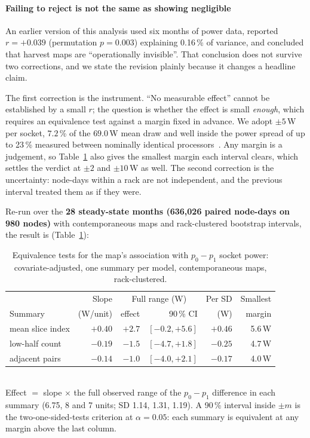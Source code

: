 \documentclass[10pt,conference]{IEEEtran}
\begin{document}
\paragraph*{Failing to reject is not the same as showing negligible} An earlier version of this
analysis used six months of power data, reported $r=+0.039$ (permutation $p=0.003$) explaining
0.16\,\% of variance, and concluded that harvest maps are ``operationally invisible''. That
conclusion does not survive two corrections, and we state the revision plainly because it changes
a headline claim.

The first correction is the instrument. ``No measurable effect'' cannot be established by a small
$r$; the question is whether the effect is small \emph{enough}, which requires an equivalence
test against a margin fixed in advance. We adopt $\pm5$\,W per socket, $7.2$\,\% of the
$69.0$\,W mean draw and well inside the power spread of up to 23\,\% measured between nominally
identical processors~\cite{inadomi2015variation}. Any margin is a judgement, so
Table~\ref{tab:tost} also gives the smallest margin each interval clears, which settles the verdict
at $\pm2$ and $\pm10$\,W as well. The second correction is
the uncertainty: node-days within a rack are not independent, and the previous interval treated
them as if they were.

Re-run over the \textbf{28 steady-state months (636{,}026 paired node-days on 980 nodes)} with
contemporaneous maps and rack-clustered bootstrap intervals, the result is
(Table~\ref{tab:tost}):

\begin{table}[h]\centering\caption{Equivalence tests for the map's association with $p_0-p_1$
socket power: covariate-adjusted, one summary per model, contemporaneous maps,
rack-clustered.}\label{tab:tost}\footnotesize
\setlength{\tabcolsep}{4pt}\begin{tabular}{lrrrrr}\toprule
 & Slope & \multicolumn{2}{c}{Full range (W)} & Per SD & Smallest\\
Summary & (W/unit) & effect & 90\,\% CI & (W) & margin\\\midrule
mean slice index & $+0.40$ & $+2.7$ & $[-0.2,+5.6]$ & $+0.46$ & 5.6\,W\\
low-half count   & $-0.19$ & $-1.5$ & $[-4.7,+1.8]$ & $-0.25$ & 4.7\,W\\
adjacent pairs   & $-0.14$ & $-1.0$ & $[-4.0,+2.1]$ & $-0.17$ & 4.0\,W\\
\bottomrule\end{tabular}
\\[2pt]\footnotesize Effect $=$ slope $\times$ the full observed range of the $p_0-p_1$
difference in each summary (6.75, 8 and 7 units; SD 1.14, 1.31, 1.19). A 90\,\% interval inside
$\pm m$ is the two-one-sided-tests criterion at $\alpha=0.05$: each summary is equivalent at any
margin above the last column.
\end{table}
\end{document}
